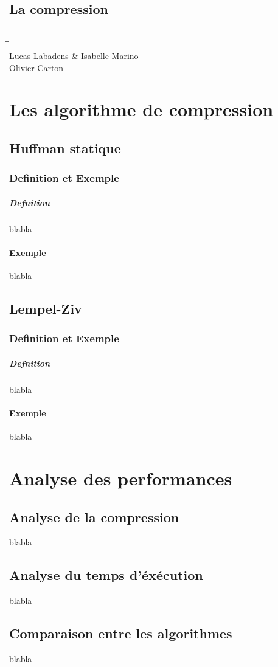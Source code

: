 \documentclass{report}
\begin{document}
\chapter*{La compression }
\paragraph*{}
\begin{tabbing}
\hspace{1.5cm}\=\hspace{1.5cm}\=\kill
 \\ Lucas Labadens \& Isabelle Marino\\
 \>Olivier Carton 
\end{tabbing} 



\part{Les algorithme de compression}
\chapter{Huffman statique}
\section{Definition et Exemple }
\subsubsection{Defnition}
blabla 
\subsection{Exemple}
blabla
\chapter{Lempel-Ziv}
\section{Definition et Exemple }
\subsubsection{Defnition}
blabla 
\subsection{Exemple}
blabla
\part{Analyse des performances}
\chapter{Analyse de la compression}
blabla
\chapter{Analyse du temps d'éxécution }
blabla
\chapter{Comparaison entre les algorithmes}
blabla
\end{document}
